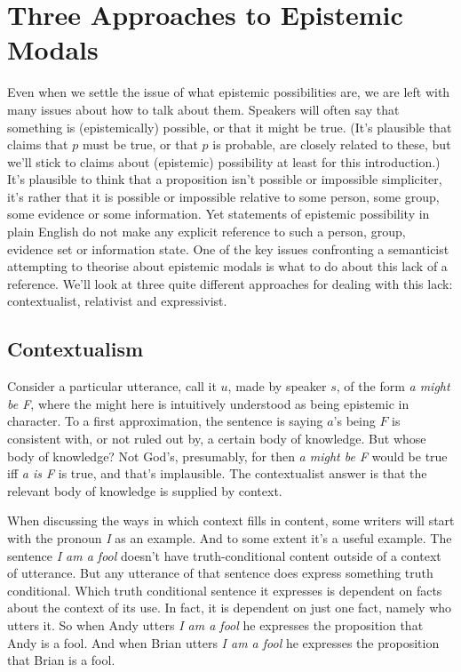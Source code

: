\section{Three Approaches to Epistemic Modals}
Even when we settle the issue of what epistemic possibilities are, we are left with many issues about how to talk about them. Speakers will often say that something is (epistemically) possible, or that it might be true. (It's plausible that claims that $p$ must be true, or that $p$ is probable, are closely related to these, but we'll stick to claims about (epistemic) possibility at least for this introduction.) It's plausible to think that a proposition isn't possible or impossible simpliciter, it's rather that it is possible or impossible relative to some person, some group, some evidence or some information. Yet statements of epistemic possibility in plain English do not make any explicit reference to such a person, group, evidence set or information state. One of the key issues confronting a semanticist attempting to theorise about epistemic modals is what to do about this lack of a reference. We'll look at three quite different approaches for dealing with this lack: contextualist, relativist and expressivist.

\subsection{Contextualism}
Consider a particular utterance, call it $u$, made by speaker $s$, of the form \textit{a might be F}, where the might here is intuitively understood as being epistemic in character. To a first approximation, the sentence is saying $a$'s being $F$ is consistent with, or not ruled out by, a certain body of knowledge. But whose body of knowledge? Not God's, presumably, for then \textit{a might be F} would be true iff \textit{a is F} is true, and that's implausible. The contextualist answer is that the relevant body of knowledge is supplied by context.

When discussing the ways in which context fills in content, some writers will start with the pronoun \textit{I} as an example. And to some extent it's a useful example. The sentence \textit{I am a fool} doesn't have truth-conditional content outside of a context of utterance. But any utterance of that sentence does express something truth conditional. Which truth conditional sentence it expresses is dependent on facts about the context of its use. In fact, it is dependent on just one fact, namely who utters it. So when Andy utters \textit{I am a fool} he expresses the proposition that Andy is a fool. And when Brian utters \textit{I am a fool} he expresses the proposition that Brian is a fool.

